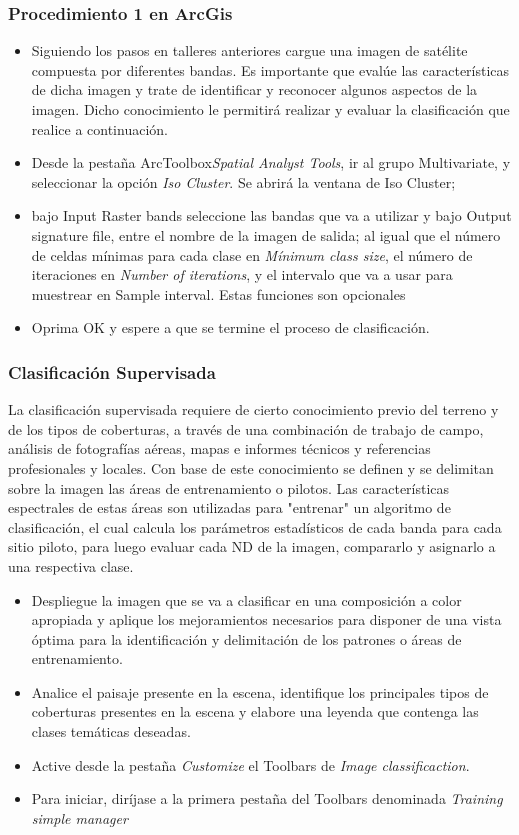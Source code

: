 \documentclass[a4paper,oneside,11pt,]{article}
\begin{document}
\subsubsection{Procedimiento 1 en ArcGis}
\begin{itemize}
\item Siguiendo los pasos en talleres anteriores cargue una imagen de satélite compuesta por diferentes bandas. Es importante que evalúe las características de dicha imagen y trate de identificar y reconocer algunos aspectos de la imagen. Dicho conocimiento le permitirá realizar y evaluar la clasificación que realice a continuación.
\item Desde la pestaña ArcToolbox\textrightarrow \emph{Spatial Analyst Tools}, ir al grupo Multivariate, y seleccionar la opción \emph{Iso Cluster}. Se abrirá la ventana de Iso Cluster; 
\item bajo Input Raster bands seleccione las bandas que va a utilizar y bajo Output signature file, entre el nombre de la imagen de salida; al igual que el número de celdas mínimas para cada clase en \emph{Mínimum class size}, el número de iteraciones en \emph{Number of iterations}, y el intervalo que va a usar para muestrear en Sample interval. Estas funciones son opcionales
\item Oprima OK y espere a que se termine el proceso de clasificación.
\end{itemize}

\subsubsection{Clasificación Supervisada}
La clasificación supervisada requiere de cierto conocimiento previo del terreno y de los tipos de coberturas, a través de una combinación de trabajo de campo, análisis de fotografías aéreas, mapas e informes técnicos y referencias profesionales y locales. Con base de este conocimiento se definen y se delimitan sobre la imagen las áreas de entrenamiento o pilotos. Las características espectrales de estas áreas son utilizadas para "entrenar" un algoritmo de clasificación, el cual calcula los parámetros estadísticos de cada banda para cada sitio piloto, para luego evaluar cada ND de la imagen, compararlo y asignarlo a una respectiva clase.
\begin{itemize}
\item Despliegue la imagen que se va a clasificar en una composición a color apropiada y aplique los mejoramientos necesarios para disponer de una vista óptima para la identificación y delimitación de los patrones o áreas de entrenamiento.
\item Analice el paisaje presente en la escena, identifique los principales tipos de coberturas presentes en la escena y elabore una leyenda que contenga las clases temáticas deseadas.
\item Active desde la pestaña \emph{Customize} el Toolbars de \emph{Image classificaction}.
\item Para iniciar, diríjase a la primera pestaña del Toolbars denominada \emph{Training simple manager} 
\end{itemize}
\end{document}
